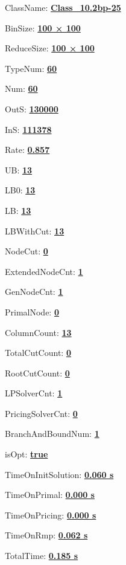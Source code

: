 \documentclass[11pt]{article}
\begin{document}
\pagestyle{empty}


ClassName: \underline{\textbf{Class_10.2bp-25}}
\par
BinSize: \underline{\textbf{100 × 100}}
\par
ReduceSize: \underline{\textbf{100 × 100}}
\par
TypeNum: \underline{\textbf{60}}
\par
Num: \underline{\textbf{60}}
\par
OutS: \underline{\textbf{130000}}
\par
InS: \underline{\textbf{111378}}
\par
Rate: \underline{\textbf{0.857}}
\par
UB: \underline{\textbf{13}}
\par
LB0: \underline{\textbf{13}}
\par
LB: \underline{\textbf{13}}
\par
LBWithCut: \underline{\textbf{13}}
\par
NodeCut: \underline{\textbf{0}}
\par
ExtendedNodeCnt: \underline{\textbf{1}}
\par
GenNodeCnt: \underline{\textbf{1}}
\par
PrimalNode: \underline{\textbf{0}}
\par
ColumnCount: \underline{\textbf{13}}
\par
TotalCutCount: \underline{\textbf{0}}
\par
RootCutCount: \underline{\textbf{0}}
\par
LPSolverCnt: \underline{\textbf{1}}
\par
PricingSolverCnt: \underline{\textbf{0}}
\par
BranchAndBoundNum: \underline{\textbf{1}}
\par
isOpt: \underline{\textbf{true}}
\par
TimeOnInitSolution: \underline{\textbf{0.060 s}}
\par
TimeOnPrimal: \underline{\textbf{0.000 s}}
\par
TimeOnPricing: \underline{\textbf{0.000 s}}
\par
TimeOnRmp: \underline{\textbf{0.062 s}}
\par
TotalTime: \underline{\textbf{0.185 s}}
\par
\newpage


\end{document}
